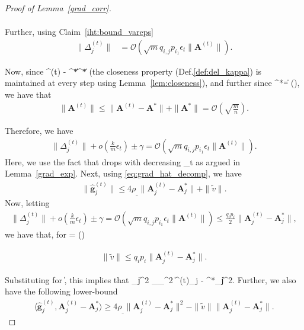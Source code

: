 \documentclass{article}
\def\[#1\]{{$#1$}}
\def\b#1{{\mathbf{#1}}}
\def\c#1{{\mathcal{#1}}}
\begin{document}
\begin{proof}[Proof of Lemma~\ref{grad_corr}]
\begin{align*}
		\end{align*}
		
		Further, using Claim~\ref{iht:bound_vareps}
		\begin{align*}
		\|\Delta^{(t)}_j\| 
		
		& = \mathcal{O}(\sqrt{m}q_{i,j}p_{i_1}\epsilon_t\|\b{A}^{(t)}\|).
		\end{align*}
		
		Now, since \[ \|\b{A}^{(t)} - \b{A}^*\| \|\b{A}^*\|\] (the closeness property (Def.\ref{def:del_kappa}) is maintained at every step using Lemma~\ref{lem:closeness}), and further since \[\|\b{A}^*\| = ()\], we have that 
		\begin{align*}
		\|\b{A}^{(t)}\| \leq \|\b{A}^{(t)} - \b{A}^*\| + \|\b{A}^*\| = \mathcal{O}(\sqrt{\tfrac{m}{n}}).
		\end{align*}
		
		Therefore, we have
			\begin{align*}
					\|\Delta^{(t)}_j\| + o(\tfrac{k}{m}\epsilon_t) \pm \gamma = \mathcal{O}(\sqrt{m}q_{i,j}p_{i_1}\epsilon_t\|\b{A}^{(t)}\|). 
			\end{align*}
			Here, we use the fact that \[\gamma\] drops with decreasing \[\epsilon_t\] as argued in Lemma~\ref{grad_exp}. Next, using \eqref{eq:grad_hat_decomp}, we have
						\begin{align*}
						\|\hat{\b{g}}^{(t)}_j\| \leq 4\rho_{\_} \|\b{A}^{(t)}_j - \b{A}^*_j\|+ \|\tilde{v}\|.
						\end{align*}
			Now, letting
				\begin{align}\label{var_eps_cond}
					\|\Delta^{(t)}_j\| + o(\tfrac{k}{m}\epsilon_t) \pm \gamma = \mathcal{O}(\sqrt{m}q_{i,j}p_{i_1}\epsilon_t\|\b{A}^{(t)}\|) \leq \tfrac{q_ip_i}{2}\| \b{A}^{(t)}_j - \b{A}^{*}_j\|,
					\end{align}
		   we have that, for \[k = \c{O} (\sqrt{n})\]
					
					\begin{align*}
					\|\tilde{v}\| \leq q_ip_i\| \b{A}^{(t)}_j - \b{A}^{*}_j\|.
					\end{align*}
		
			
	
			
		
				
				Substituting for \[\|\|\], this implies that \[\|\hat{\b{g}^{(t)}}_j\|^2 \rho_{\_}^2 \|\b{A}^{(t)}_j - \b{A}^*_j\|^2\]. Further, we also have the following lower-bound
				\begin{align*}
				\langle \hat{\b{g}}^{(t)}_j, \b{A}^{(t)}_j - \b{A}^*_j\rangle \geq 4\rho_{\_} \|\b{A}^{(t)}_j - \b{A}^*_j\|^2 - \|\tilde{v}\| \|\b{A}^{(t)}_j - \b{A}^*_j\|.
				\end{align*}
				

\end{proof}
\end{document}
